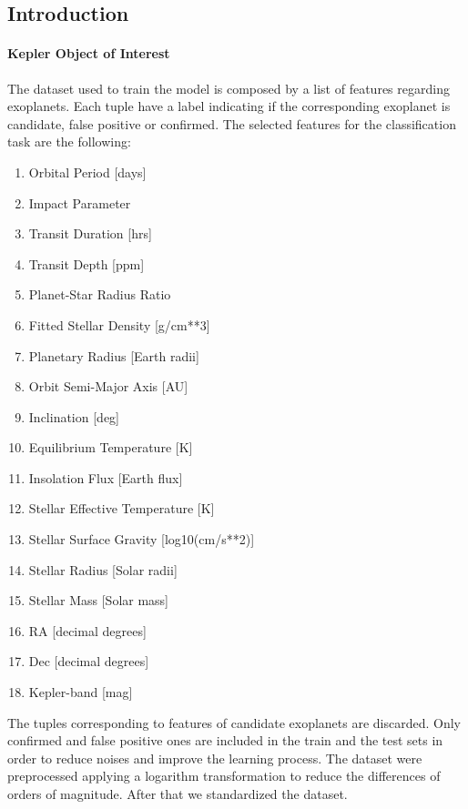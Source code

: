 \documentclass[11pt, a4paper]{article}
\begin{document}
\begin{multicols}{2}
\section{Introduction}
  \paragraph{Kepler Object of Interest}
    The dataset used to train the model is composed by a list of features regarding exoplanets. Each tuple have a label indicating if the corresponding exoplanet is candidate, false positive or confirmed. The selected features for the classification task are the following:
    \begin{enumerate}
      \item Orbital Period [days]
      \item Impact Parameter
      \item Transit Duration [hrs]
      \item Transit Depth [ppm]
      \item Planet-Star Radius Ratio
      \item Fitted Stellar Density [g/cm**3]
      \item Planetary Radius [Earth radii]
      \item Orbit Semi-Major Axis [AU]
      \item Inclination [deg]
      \item Equilibrium Temperature [K]
      \item Insolation Flux [Earth flux]
      \item Stellar Effective Temperature [K]
      \item Stellar Surface Gravity [log10(cm/s**2)]
      \item Stellar Radius [Solar radii]
      \item Stellar Mass [Solar mass]
      \item RA [decimal degrees]
      \item Dec [decimal degrees]
      \item Kepler-band [mag]
    \end{enumerate}
    The tuples corresponding to features of candidate exoplanets are discarded. Only confirmed and false positive ones are included in the train and the test sets in order to reduce noises and improve the learning process.
    The dataset were preprocessed applying a logarithm transformation to reduce the differences of orders of magnitude. After that we standardized the dataset.

\end{multicols}
\end{document}
